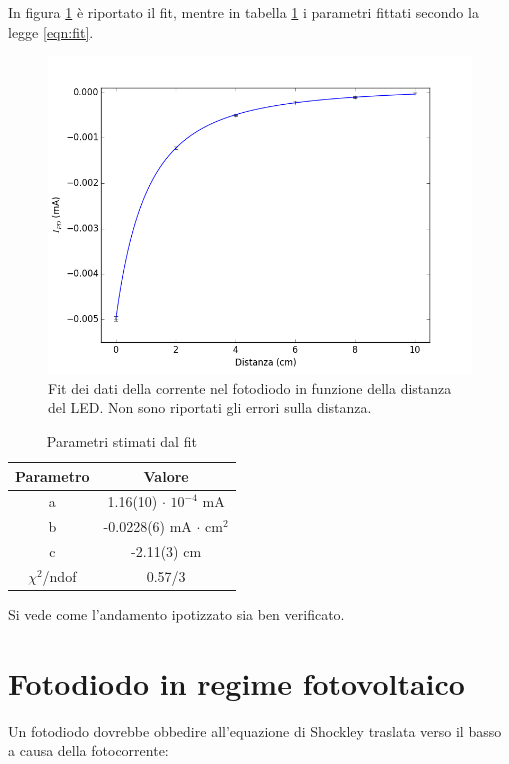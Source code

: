 \documentclass[journal, a4paper]{IEEEtran}
\begin{document}
In figura \ref{fig:discor} è riportato il fit, mentre in tabella \ref{tab:fit} i parametri fittati secondo la legge \ref{eqn:fit}.

\begin{figure}[htp]
\centering
\includegraphics[scale=.4]{distanza_cor}
\caption{Fit dei dati della corrente nel fotodiodo in funzione della distanza del LED. Non sono riportati gli errori sulla distanza.}
\label{fig:discor}
\end{figure}

\begin{table}
\centering
\caption{Parametri stimati dal fit}
\label{tab:fit}
\begin{tabular}{|c|c|}
\hline 
Parametro & Valore \\ 
\hline 
a & 1.16(10) $\cdot$ $10^{-4}$ mA \\ 
\hline 
b & -0.0228(6) mA $\cdot$ cm$^2$  \\ 
\hline 
c & -2.11(3) cm \\ 
\hline 
$\chi ^2$/ndof & 0.57/3 \\ 
\hline 
\end{tabular} 
\end{table}

Si vede come l'andamento ipotizzato sia ben verificato.

\section{Fotodiodo in regime fotovoltaico}

Un fotodiodo dovrebbe obbedire all'equazione di Shockley traslata verso il basso a causa della fotocorrente:
\end{document}
